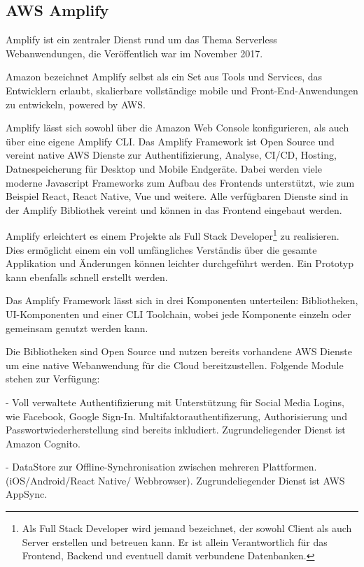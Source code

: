 
\subsection{AWS Amplify}

Amplify ist ein zentraler Dienst rund um das Thema Serverless Webanwendungen, die Veröffentlich war im November 2017.

Amazon bezeichnet Amplify selbst als {}\glqq ein Set aus Tools und Services, das Entwicklern erlaubt, skalierbare vollständige
mobile und Front-End-Anwendungen zu entwickeln, powered by AWS.\grqq{}\cite[]{AWSAmplify}

Amplify lässt sich sowohl über die Amazon Web Console konfigurieren, als auch über eine eigene Amplify CLI.
Das Amplify Framework ist Open Source und vereint native AWS Dienste zur Authentifizierung, Analyse, CI/CD, Hosting, Datnespeicherung für Desktop und Mobile
Endgeräte. Dabei werden viele moderne Javascript Frameworks zum Aufbau des Frontends unterstützt, wie zum Beispiel React, React Native, Vue und weitere.
Alle verfügbaren Dienste sind in der Amplify Bibliothek vereint und können in das Frontend eingebaut werden.

Amplify erleichtert es einem Projekte als Full Stack Developer\footnote{Als Full Stack Developer wird jemand bezeichnet, der sowohl Client als auch Server
erstellen und betreuen kann. Er ist allein Verantwortlich für das Frontend, Backend und eventuell damit verbundene Datenbanken.} zu realisieren.
Dies ermöglicht einem ein voll umfängliches Verständis über die gesamte Applikation und Änderungen können leichter durchgeführt werden.
Ein Prototyp kann ebenfalls schnell erstellt werden.

Das Amplify Framework lässt sich in drei Komponenten unterteilen: Bibliotheken, UI-Komponenten und einer CLI Toolchain, wobei jede Komponente einzeln oder gemeinsam genutzt werden kann.

Die Bibliotheken sind Open Source und nutzen bereits vorhandene AWS Dienste um eine native Webanwendung für die Cloud bereitzustellen.
Folgende Module stehen zur Verfügung:

- Voll verwaltete Authentifizierung mit Unterstützung für Social Media Logins, wie Facebook, Google Sign-In. Multifaktorauthentifizerung, Authorisierung und Passwortwiederherstellung sind
bereits inkludiert. Zugrundeliegender Dienst ist Amazon Cognito.

- DataStore zur Offline-Synchronisation zwischen mehreren Plattformen. (iOS/Android/React Native/ Webbrowser). Zugrundeliegender Dienst ist AWS AppSync.

